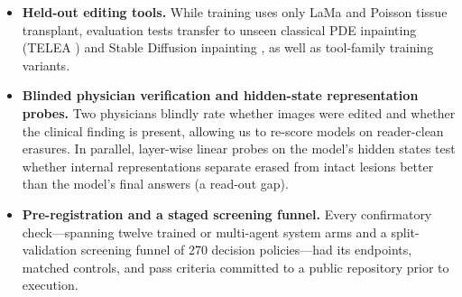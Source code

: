 \documentclass{article} %
\begin{document}
\begin{itemize}[leftmargin=*,nosep]
    \item \textbf{Held-out editing tools.} While training uses only LaMa and Poisson tissue transplant, evaluation tests transfer to unseen classical PDE inpainting (TELEA \citep{telea2004image}) and Stable Diffusion inpainting \citep{rombach2022high}, as well as tool-family training variants.
    \item \textbf{Blinded physician verification and hidden-state representation probes.} Two physicians blindly rate whether images were edited and whether the clinical finding is present, allowing us to re-score models on reader-clean erasures. In parallel, layer-wise linear probes \citep{alain2016understanding} on the model's hidden states test whether internal representations separate erased from intact lesions better than the model's final answers (a read-out gap).
    \item \textbf{Pre-registration and a staged screening funnel.} Every confirmatory check---spanning twelve trained or multi-agent system arms and a split-validation screening funnel of 270 decision policies---had its endpoints, matched controls, and pass criteria committed to a public repository prior to execution.
\end{itemize}
\end{document}
